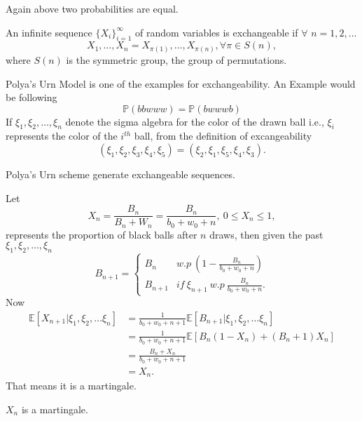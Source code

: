 \documentclass[a4paper,english,10pt]{article}
\begin{document}
Again above two probabilities are equal.
\begin{defn}
An infinite sequence $\{X_i\}_{i=1}^{\infty}$ of random variables is exchangeable if $\forall$ $n=1,2,\dots$
 \begin{equation*}
X_1,\dots,X_n=X_{\pi(1)},\dots ,X_{\pi(n)}, \forall \pi \in S(n),
\end{equation*}
where $S(n)$ is the symmetric group, the group of permutations.
\end{defn}
Polya's Urn Model is one of the examples for exchangeability. An Example would be following
 \begin{equation*}
\mathbb{P}(bbwww)=\mathbb{P}(bwwwb)
\end{equation*}
If $\xi_1,\xi_2,\dots,\xi_n$ denote the sigma algebra for the color of the drawn ball i.e., $\xi_i$ represents the color of the $i^{th}$ ball, from the definition of excangeability
\begin{equation*}
(\xi_1,\xi_2,\xi_3,\xi_4,\xi_5)=(\xi_2,\xi_1,\xi_5,\xi_4,\xi_3).
\end{equation*}
\begin{note}
Polya's Urn scheme generate exchangeable sequences.
\end{note}
Let 
\begin{equation*}
X_n=\frac{B_n}{B_n+W_n}=\frac{B_n}{b_0+w_0+n},\ 0\leq X_n \leq1,
\end{equation*}
represents the proportion of black balls after $n$ draws, then given the past $\xi_1,\xi_2,\dots,\xi_n$
\begin{equation*}
B_{n+1} =
\left\{
	\begin{array}{ll}
		B_n  & w.p \ (1-\frac{B_n}{b_0+w_0+n}) \\
		B_{n+1} & if \ \xi_{n+1} \ w.p \ \frac{B_n}{b_0+w_0+n}.
	\end{array}
\right.
\end{equation*}
Now
\begin{align*}
\mathbb{E}[X_{n+1}|\xi_1,\xi_2,\dots\xi_n]&=\frac{1}{b_0+w_0+n+1}\mathbb{E}[B_{n+1}|\xi_1,\xi_2,\dots\xi_n]\\
								&=\frac{1}{b_0+w_0+n+1}\mathbb{E}[B_n(1-X_n)+(B_n+1)X_n]\\
								&=\frac{B_n+X_n}{b_0+w_0+n+1}\\
								&=X_n.
\end{align*}
That means it is a martingale.
\begin{note}
$X_n$ is a martingale.
\end{note}
\end{document}
